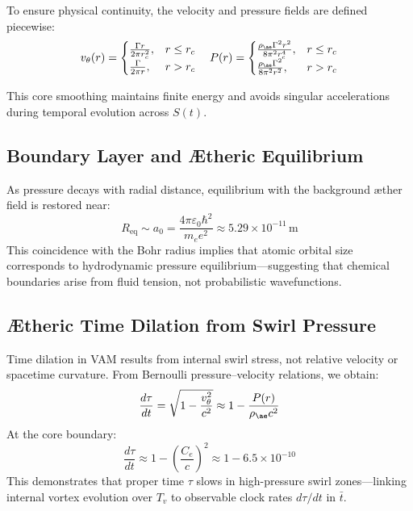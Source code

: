 To ensure physical continuity, the velocity and pressure fields are defined piecewise:
\[
v_\theta(r) =
\begin{cases}
\frac{\Gamma r}{2\pi r_c^2}, & r \leq r_c \\
\frac{\Gamma}{2\pi r}, & r > r_c
\end{cases}
\quad
P(r) =
\begin{cases}
\frac{\rho_{\ae} \Gamma^2 r^2}{8\pi^2 r_c^4}, & r \leq r_c \\
\frac{\rho_{\ae} \Gamma^2}{8\pi^2 r^2}, & r > r_c
\end{cases}
\]

This core smoothing maintains finite energy and avoids singular accelerations during temporal evolution across \( S(t) \).

\subsection{Boundary Layer and Ætheric Equilibrium}

As pressure decays with radial distance, equilibrium with the background æther field is restored near:
\[
R_{\text{eq}} \sim a_0 = \frac{4\pi \varepsilon_0 \hbar^2}{m_e e^2} \approx 5.29 \times 10^{-11} \, \text{m}
\]
This coincidence with the Bohr radius implies that atomic orbital size corresponds to hydrodynamic pressure equilibrium—suggesting that chemical boundaries arise from fluid tension, not probabilistic wavefunctions.

\subsection{Ætheric Time Dilation from Swirl Pressure}

Time dilation in VAM results from internal swirl stress, not relative velocity or spacetime curvature. From Bernoulli pressure–velocity relations, we obtain:
\[
\frac{d\tau}{dt} = \sqrt{1 - \frac{v_\theta^2}{c^2}} \approx 1 - \frac{P(r)}{\rho_{\ae} c^2}
\]
At the core boundary:
\[
\frac{d\tau}{dt} \approx 1 - \left( \frac{C_e}{c} \right)^2 \approx 1 - 6.5 \times 10^{-10}
\]
This demonstrates that proper time \( \tau \) slows in high-pressure swirl zones—linking internal vortex evolution over \( T_v \) to observable clock rates \( d\tau/dt \) in \( \bar{t} \).


